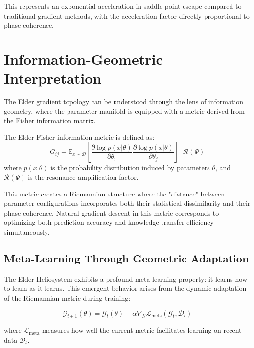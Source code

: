 This represents an exponential acceleration in saddle point escape compared to traditional gradient methods, with the acceleration factor directly proportional to phase coherence.

\section{Information-Geometric Interpretation}

The Elder gradient topology can be understood through the lens of information geometry, where the parameter manifold is equipped with a metric derived from the Fisher information matrix.

\begin{definition}
The Elder Fisher information metric is defined as:
\begin{equation}
G_{ij} = \mathbb{E}_{x \sim \mathcal{D}} \left[ \frac{\partial \log p(x|\theta)}{\partial \theta_i} \frac{\partial \log p(x|\theta)}{\partial \theta_j} \right] \cdot \mathcal{R}(\Psi)
\end{equation}
where $p(x|\theta)$ is the probability distribution induced by parameters $\theta$, and $\mathcal{R}(\Psi)$ is the resonance amplification factor.
\end{definition}

This metric creates a Riemannian structure where the "distance" between parameter configurations incorporates both their statistical dissimilarity and their phase coherence. Natural gradient descent in this metric corresponds to optimizing both prediction accuracy and knowledge transfer efficiency simultaneously.

\subsection{Meta-Learning Through Geometric Adaptation}

The Elder Heliosystem exhibits a profound meta-learning property: it learns how to learn as it learns. This emergent behavior arises from the dynamic adaptation of the Riemannian metric during training:

\begin{equation}
\mathcal{G}_{t+1}(\theta) = \mathcal{G}_t(\theta) + \alpha \nabla_{\mathcal{G}} \mathcal{L}_{\text{meta}}(\mathcal{G}_t, \mathcal{D}_t)
\end{equation}

where $\mathcal{L}_{\text{meta}}$ measures how well the current metric facilitates learning on recent data $\mathcal{D}_t$.

